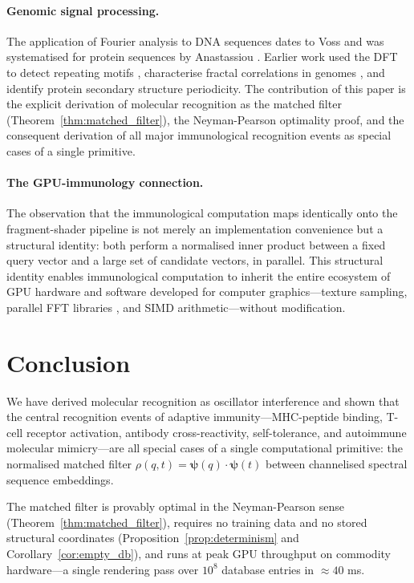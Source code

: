 \documentclass[twocolumn,11pt,a4paper]{article}
\theoremstyle{definition}
\theoremstyle{remark}
\begin{document}
\paragraph{Genomic signal processing.}
The application of Fourier analysis to DNA sequences dates to Voss
\citep{voss1992} and was systematised for protein sequences by Anastassiou
\citep{anastassiou2001}. Earlier work used the DFT to detect repeating motifs
\citep{trifonov1980}, characterise fractal correlations in genomes
\citep{voss1992}, and identify protein secondary structure periodicity. The
contribution of this paper is the explicit derivation of molecular recognition
as the matched filter (Theorem~\ref{thm:matched_filter}), the Neyman-Pearson
optimality proof, and the consequent derivation of all major immunological
recognition events as special cases of a single primitive.

\paragraph{The GPU-immunology connection.}
The observation that the immunological computation maps identically onto the
fragment-shader pipeline is not merely an implementation convenience but a
structural identity: both perform a normalised inner product between a fixed
query vector and a large set of candidate vectors, in parallel. This
structural identity enables immunological computation to inherit the entire
ecosystem of GPU hardware and software developed for computer graphics---texture
sampling, parallel FFT libraries \citep{moreland2003,govindaraju2008}, and
SIMD arithmetic---without modification.

\section{Conclusion}
\label{sec:conclusion}

We have derived molecular recognition as oscillator interference and shown
that the central recognition events of adaptive immunity---MHC-peptide binding,
T-cell receptor activation, antibody cross-reactivity, self-tolerance, and
autoimmune molecular mimicry---are all special cases of a single computational
primitive: the normalised matched filter
$\rho(q,t) = \bm{\psi}(q)\cdot\bm{\psi}(t)$
between channelised spectral sequence embeddings.

The matched filter is provably optimal in the Neyman-Pearson sense
(Theorem~\ref{thm:matched_filter}), requires no training data and no stored
structural coordinates (Proposition~\ref{prop:determinism} and
Corollary~\ref{cor:empty_db}), and runs at peak GPU throughput on commodity
hardware---a single rendering pass over $10^8$ database entries in
$\approx 40$ ms.
\end{document}
